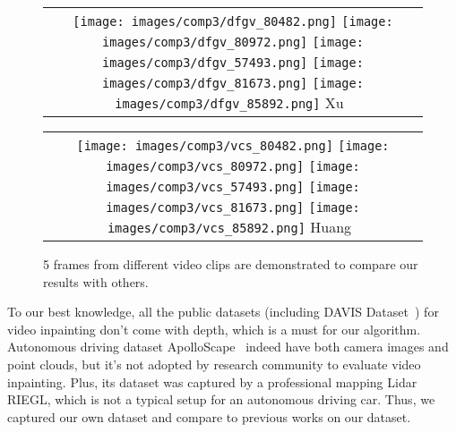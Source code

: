 \documentclass[runningheads]{llncs}
\begin{document}
\begin{figure}[b!]
\begin{tabular}{@{}c@{}}
    \centering
    \raisebox{-.5\height} {
    \texttt{[image: images/comp3/dfgv\_80482.png]}\hspace{-0.06 cm}
    \texttt{[image: images/comp3/dfgv\_80972.png]}\hspace{-0.06 cm}
    \texttt{[image: images/comp3/dfgv\_57493.png]}\hspace{-0.06 cm}
    \texttt{[image: images/comp3/dfgv\_81673.png]}\hspace{-0.06 cm}
    \texttt{[image: images/comp3/dfgv\_85892.png]}
    } Xu~\cite{Xu_2019_CVPR}
\end{tabular}

\begin{tabular}{@{}c@{}}
    \centering
    \raisebox{-.5\height} {
    \texttt{[image: images/comp3/vcs\_80482.png]}\hspace{-0.06 cm}
    \texttt{[image: images/comp3/vcs\_80972.png]}\hspace{-0.06 cm}
    \texttt{[image: images/comp3/vcs\_57493.png]}\hspace{-0.06 cm}
    \texttt{[image: images/comp3/vcs\_81673.png]}\hspace{-0.06 cm}
    \texttt{[image: images/comp3/vcs\_85892.png]}
    } Huang~\cite{Huang-SigAsia-2016}
\end{tabular}

\caption{5 frames from different video clips are demonstrated to compare our results with others.}
\label{fig:comp2}
\end{figure}



To our best knowledge, all the public datasets (including  DAVIS Dataset~\cite{perazzi2016benchmark}) for video inpainting don't come with depth, which is a must for our algorithm. Autonomous driving dataset ApolloScape~\cite{ma2019trafficpredict} indeed have both camera images and point clouds, but it's not adopted by research community to evaluate video inpainting. Plus, its dataset was captured by a professional mapping Lidar RIEGL, which is not a typical setup for an autonomous driving car. Thus, we captured our own dataset and compare to previous works on our dataset. 
\end{document}
